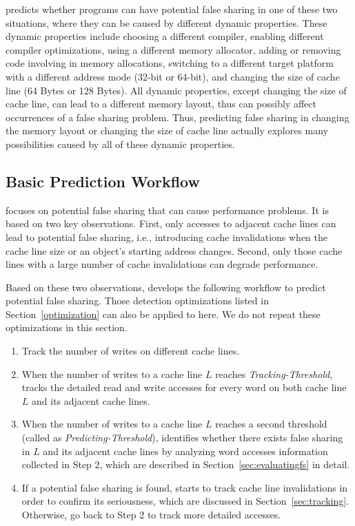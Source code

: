 \Predator{} predicts whether programs can have potential false sharing in one of these two situations, where they can be caused by different dynamic properties. These dynamic properties include choosing a different compiler, enabling different compiler optimizations, using a different memory allocator, adding or removing code involving in memory allocations, switching to a different target platform with a different address mode (32-bit or 64-bit), and changing the size of cache line (64 Bytes or 128 Bytes). 
All dynamic properties, except changing the size of cache line, can lead to a different memory layout, thus can possibly affect occurrences of a false sharing problem. Thus, predicting false sharing in changing the memory layout or changing the size of cache line actually explores many possibilities caused by all of these dynamic properties.

\subsection{Basic Prediction Workflow}
\label{sec:predictionmechanism} 

\Predator{} focuses on potential false sharing that can 
cause performance problems.
It is based on two key observations. First, only accesses to 
adjacent cache lines can lead to potential false sharing, 
i.e., introducing cache invalidations when the cache line size
or an object's starting address changes.
Second, only those cache lines with a large number of cache invalidations can degrade performance.

Based on these two observations, \Predator{} develops 
the following workflow to predict potential false sharing.
Those detection optimizations listed in Section~\ref{optimization} can also be applied
to here. We do not repeat these optimizations in this section.

\begin{enumerate}
\item
Track the number of writes on different cache lines. 

\item
When the number of writes to a cache line $L$ reaches {\it Tracking-Threshold},
\predator{} tracks the detailed read and write accesses for every word on both cache line $L$ 
and its adjacent cache lines. 

\item
When the number of writes to a cache line $L$ reaches a second threshold (called as
{\it Predicting-Threshold}), 
\predator{} identifies whether there exists false sharing in $L$ and its adjacent cache lines by analyzing word accesses information collected in Step 2, which are described in 
Section~\ref{sec:evaluatingfs} in detail.

\item
If a potential false sharing is found, \predator{} starts to track cache line invalidations in order to confirm its seriousness, which are discussed in Section~\ref{sec:tracking}.
Otherwise, go back to Step 2 to track more detailed accesses.
 
\end{enumerate}

